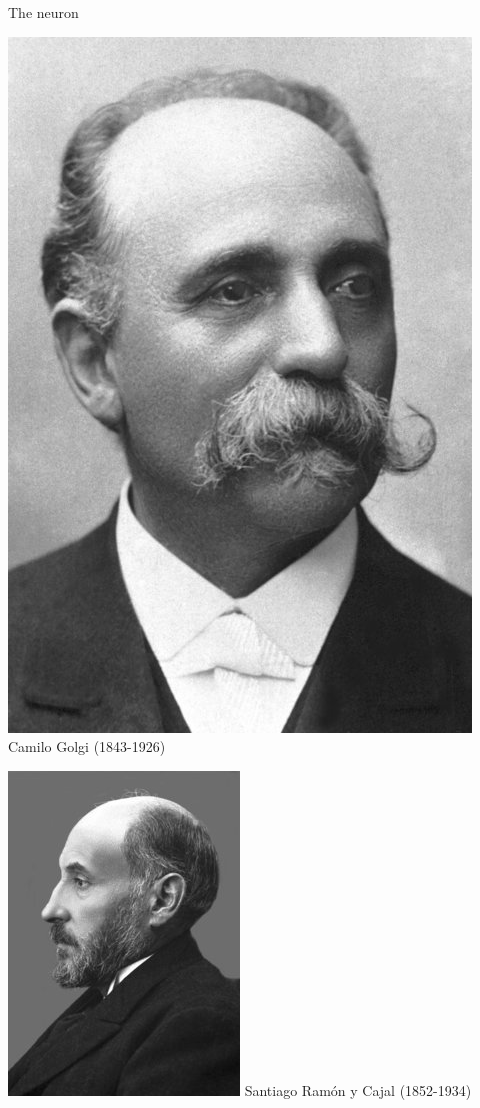 \documentclass{beamer}
\begin{document}
\begin{frame}{The neuron}
\begin{multicols}{3}

\includegraphics[scale=0.935]{pics/golgi.jpg}
Camilo Golgi (1843-1926)
\columnbreak

\includegraphics[scale=2]{pics/cajal.jpg}
Santiago Ram\'on  y Cajal (1852-1934)


\end{multicols}
\end{frame}
\end{document}
